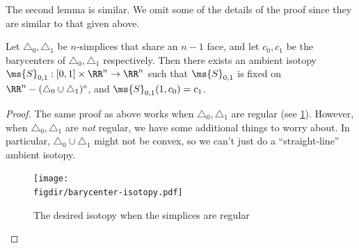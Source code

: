 The second lemma is similar. We omit some of the details of the
proof since they are similar to that given above.
\begin{proposition} \label{prop:barycenter-exchange}
  Let $\triangle_0, \triangle_1$ be $n$-simplices that share an $n-1$
  face, and let $c_0, c_1$ be the barycenters of $\triangle_0,
  \triangle_1$ respectively. Then there exists an ambient isotopy
  $\ms{S}_{0,1} : [0,1] \times \RR^n \to \RR^n$ such that
  $\ms{S}_{0,1}$ is fixed on $\RR^n - (\triangle_0 \cup
  \triangle_1)^\circ$, and $\ms{S}_{0,1}(1, c_0) = c_1$.
\end{proposition}
\begin{proof}\renewcommand{\qed}{\hfill$\square$}
  The same proof as above works when $\triangle_0, \triangle_1$
  are regular (see \cref{fig:barycenter-isotopy}). However, when
  $\triangle_0, \triangle_1$ are \emph{not} regular, we have some
  additional things to worry about. In particular, $\triangle_0
  \cup \triangle_1$ might not be convex, so we can't just do a
  ``straight-line'' ambient isotopy.
  \begin{figure}[H]
    \centering
    \texttt{[image: \\figdir/barycenter-isotopy.pdf]}
    \caption{The desired isotopy when the simplices are regular}
    \label{fig:barycenter-isotopy}
  \end{figure}


\end{proof}
